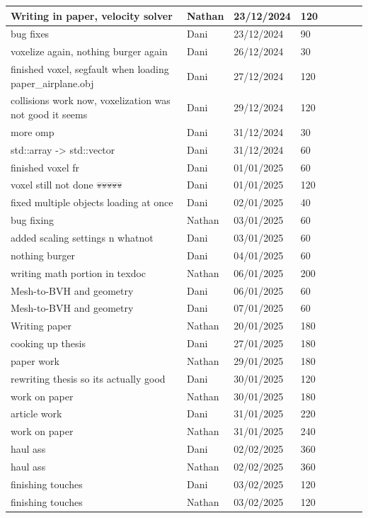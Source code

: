 \documentclass[a4paper,12pt,titlepage]{article}
\begin{document}
\begin{longtable}{|p{200pt}|l|l|l|l|l|l|l|}
	Writing in paper, velocity solver & Nathan & 23/12/2024 & 120 \\ \hline
	bug fixes & Dani & 23/12/2024 & 90 \\ \hline
	voxelize again, nothing burger again & Dani & 26/12/2024 & 30 \\ \hline
	finished  voxel, segfault when loading paper\_airplane.obj & Dani & 27/12/2024 & 120 \\ \hline
	collisions work now, voxelization was not good it seems & Dani & 29/12/2024 & 120 \\ \hline
	more omp & Dani & 31/12/2024 & 30 \\ \hline
	std::array -> std::vector & Dani & 31/12/2024 & 60 \\ \hline
	finished voxel fr & Dani & 01/01/2025 & 60 \\ \hline
	voxel still not done 💀💀💀💀💀 & Dani & 01/01/2025 & 120 \\ \hline
	fixed multiple objects loading at once & Dani & 02/01/2025 & 40 \\ \hline
	bug fixing & Nathan & 03/01/2025 & 60 \\ \hline
	added scaling settings n whatnot & Dani & 03/01/2025 & 60 \\ \hline
	nothing burger & Dani & 04/01/2025 & 60 \\ \hline
	writing math portion in texdoc & Nathan & 06/01/2025 & 200 \\ \hline
	Mesh-to-BVH and geometry & Dani & 06/01/2025 & 60 \\ \hline
	Mesh-to-BVH and geometry & Dani & 07/01/2025 & 60 \\ \hline
	Writing paper & Nathan & 20/01/2025 & 180 \\ \hline
	cooking up thesis & Dani & 27/01/2025 & 180 \\ \hline
	paper work & Nathan & 29/01/2025 & 180 \\ \hline
	rewriting thesis so its actually good & Dani & 30/01/2025 & 120 \\ \hline
	work on paper & Nathan & 30/01/2025 & 180 \\ \hline
	article work & Dani & 31/01/2025 & 220 \\ \hline
	work on paper & Nathan & 31/01/2025 & 240 \\ \hline
	haul ass & Dani & 02/02/2025 & 360 \\ \hline
	haul ass & Nathan & 02/02/2025 & 360 \\ \hline
	finishing touches & Dani & 03/02/2025 & 120 \\ \hline
	finishing touches & Nathan & 03/02/2025 & 120 \\ \hline
\end{longtable}
\end{document}
